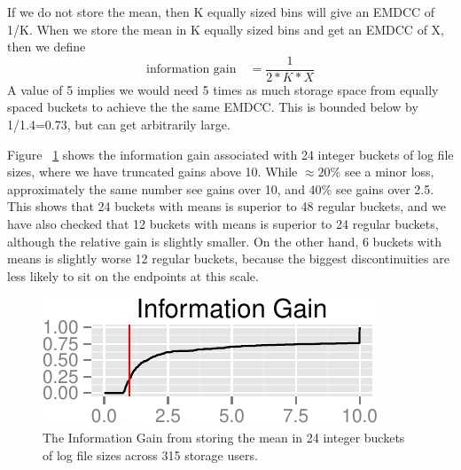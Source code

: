 \documentclass[preprint]{sig-alternate-per}
\begin{document}
If we do not store the mean, then K equally sized bins will give an EMDCC of 1/K.  When we store the mean in K equally sized bins and get an EMDCC of X, then we define
$$ \text{information gain} \quad = \frac{1}{2*K*X} $$
A value of 5 implies we would need 5 times as much storage space from equally spaced buckets to achieve the the same EMDCC.  This is bounded below by 1/1.4=0.73, but can get arbitrarily large.

Figure ~\ref{fig:validation} shows the information gain associated with 24 integer buckets of log file sizes, where we have truncated gains above 10.  While $\approx20\%$ see a minor loss, approximately the same number see gains over 10, and 40\% see gains over 2.5.  This shows that 24 buckets with means is superior to 48 regular buckets, and we have also checked that 12 buckets with means is superior to 24 regular buckets, although the relative gain is slightly smaller.  On the other hand, 6 buckets with means is slightly worse 12 regular buckets, because the biggest discontinuities are less likely to sit on the endpoints at this scale.

\begin{figure}[h!]
\centering
\includegraphics[width=\linewidth]{inforatio.pdf}
\caption{The Information Gain from storing the mean in 24 integer buckets of log file sizes across 315 storage users.}
\label{fig:validation}
\end{figure}

%
\end{document}

